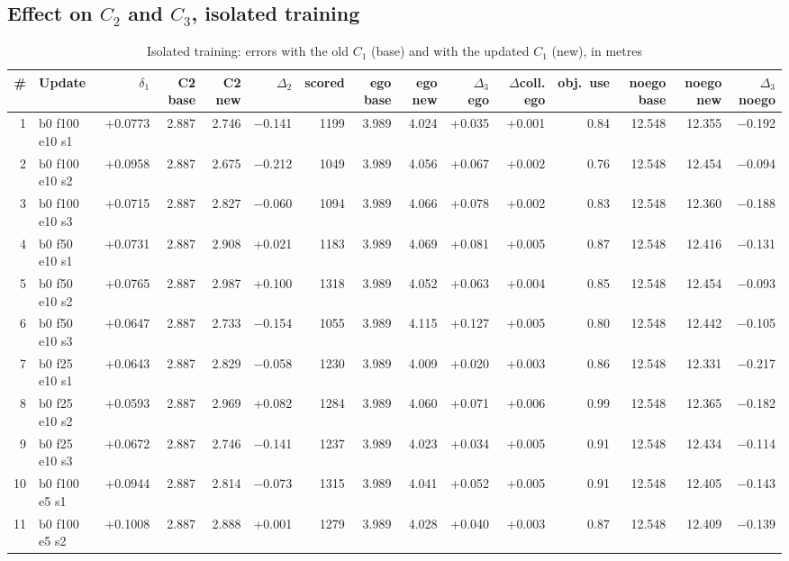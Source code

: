 \documentclass[10pt,a4paper]{article}
\begin{document}
\begin{landscape}\subsection{Effect on $C_2$ and $C_3$, isolated training}\begin{table}[h!]\centering\scriptsize\caption{Isolated training: errors with the old $C_1$ (base) and with the updated $C_1$ (new), in metres}
\begin{tabular}{rlrrrrrrrrrrrrr}\toprule
\# & Update & $\delta_1$ & C2 base & C2 new & $\Delta_2$ & scored & ego base & ego new & $\Delta_3$ ego & $\Delta$coll. ego & obj.\ use & noego base & noego new & $\Delta_3$ noego\\\midrule
1 & b0 f100 e10 s1 & +0.0773 & 2.887 & 2.746 & $-$0.141 & 1199 & 3.989 & 4.024 & +0.035 & +0.001 & 0.84 & 12.548 & 12.355 & $-$0.192\\
2 & b0 f100 e10 s2 & +0.0958 & 2.887 & 2.675 & $-$0.212 & 1049 & 3.989 & 4.056 & +0.067 & +0.002 & 0.76 & 12.548 & 12.454 & $-$0.094\\
3 & b0 f100 e10 s3 & +0.0715 & 2.887 & 2.827 & $-$0.060 & 1094 & 3.989 & 4.066 & +0.078 & +0.002 & 0.83 & 12.548 & 12.360 & $-$0.188\\
4 & b0 f50 e10 s1 & +0.0731 & 2.887 & 2.908 & +0.021 & 1183 & 3.989 & 4.069 & +0.081 & +0.005 & 0.87 & 12.548 & 12.416 & $-$0.131\\
5 & b0 f50 e10 s2 & +0.0765 & 2.887 & 2.987 & +0.100 & 1318 & 3.989 & 4.052 & +0.063 & +0.004 & 0.85 & 12.548 & 12.454 & $-$0.093\\
6 & b0 f50 e10 s3 & +0.0647 & 2.887 & 2.733 & $-$0.154 & 1055 & 3.989 & 4.115 & +0.127 & +0.005 & 0.80 & 12.548 & 12.442 & $-$0.105\\
7 & b0 f25 e10 s1 & +0.0643 & 2.887 & 2.829 & $-$0.058 & 1230 & 3.989 & 4.009 & +0.020 & +0.003 & 0.86 & 12.548 & 12.331 & $-$0.217\\
8 & b0 f25 e10 s2 & +0.0593 & 2.887 & 2.969 & +0.082 & 1284 & 3.989 & 4.060 & +0.071 & +0.006 & 0.99 & 12.548 & 12.365 & $-$0.182\\
9 & b0 f25 e10 s3 & +0.0672 & 2.887 & 2.746 & $-$0.141 & 1237 & 3.989 & 4.023 & +0.034 & +0.005 & 0.91 & 12.548 & 12.434 & $-$0.114\\
10 & b0 f100 e5 s1 & +0.0944 & 2.887 & 2.814 & $-$0.073 & 1315 & 3.989 & 4.041 & +0.052 & +0.005 & 0.91 & 12.548 & 12.405 & $-$0.143\\
11 & b0 f100 e5 s2 & +0.1008 & 2.887 & 2.888 & +0.001 & 1279 & 3.989 & 4.028 & +0.040 & +0.003 & 0.87 & 12.548 & 12.409 & $-$0.139\\

\end{tabular}
\end{table}
\end{landscape}
\end{document}
